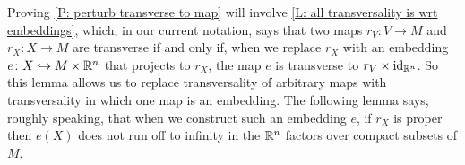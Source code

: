 Proving \cref{P: perturb transverse to map} will involve \cref{L: all transversality is wrt embeddings}, which, in our current notation, says that two maps $r_V \colon V \to M$ and $r_X \colon X \to M$ are transverse if and only if, when we replace $r_X$ with an embedding $e \colon X \hookrightarrow M \times \mathbb{R}^n$ that projects to $r_X$, the map $e$ is transverse to $r_V \times \mathrm{id}_{\mathbb{R}^n}$.
So this lemma allows us to replace transversality of arbitrary maps with transversality in which one map is an embedding.
The following lemma says, roughly speaking, that when we construct such an embedding $e$, if $r_X$ is proper then $e(X)$ does not run off to infinity in the $\mathbb{R}^n$ factors over compact subsets of $M$.

